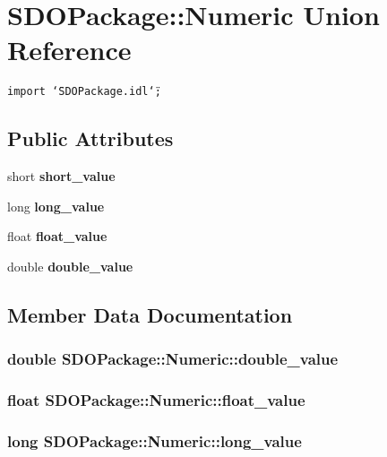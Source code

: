\section{SDOPackage::Numeric Union Reference}
\label{unionSDOPackage_1_1Numeric}
{\tt import \char`\"{}SDOPackage.idl\char`\"{};}

\subsection*{Public Attributes}
\begin{CompactItemize}
\item 
short {\bf short\_\-value}
\item 
long {\bf long\_\-value}
\item 
float {\bf float\_\-value}
\item 
double {\bf double\_\-value}
\end{CompactItemize}


\subsection{Member Data Documentation}
\subsubsection{\setlength{\rightskip}{0pt plus 5cm}double {\bf SDOPackage::Numeric::double\_\-value}}\label{unionSDOPackage_1_1Numeric_SDOPackage_1_1Numerico3}


\subsubsection{\setlength{\rightskip}{0pt plus 5cm}float {\bf SDOPackage::Numeric::float\_\-value}}\label{unionSDOPackage_1_1Numeric_SDOPackage_1_1Numerico2}


\subsubsection{\setlength{\rightskip}{0pt plus 5cm}long {\bf SDOPackage::Numeric::long\_\-value}}\label{unionSDOPackage_1_1Numeric_SDOPackage_1_1Numerico1}


